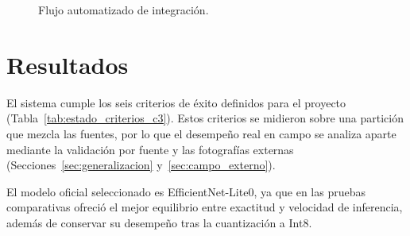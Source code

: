 \begin{figure}[H]
\vspace*{0.3cm}
\caption{Flujo automatizado de integraci\'on.}
\label{fig:automatizacion_repos}
\end{figure}

\section{Resultados}

El sistema cumple los seis criterios de \'exito definidos para el proyecto (Tabla~\ref{tab:estado_criterios_c3}). Estos criterios se midieron sobre una partici\'on que mezcla las fuentes, por lo que el desempe\~no real en campo se analiza aparte mediante la validaci\'on por fuente y las fotograf\'ias externas (Secciones~\ref{sec:generalizacion} y~\ref{sec:campo_externo}).

El modelo oficial seleccionado es EfficientNet-Lite0, ya que en las pruebas comparativas ofreci\'o el mejor equilibrio entre exactitud y velocidad de inferencia, adem\'as de conservar su desempe\~no tras la cuantizaci\'on a Int8.

